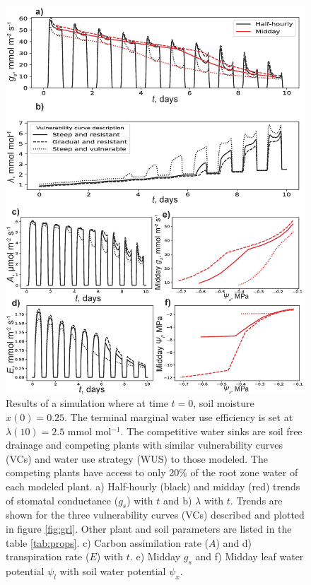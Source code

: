\documentclass[utf8]{frontiersSCNS} %
\begin{document}
\begin{figure}[h]
    \begin{center}
         \includegraphics[scale=0.65]{WUS_comp.jpg}   
    \end{center}
    \caption{Results of a simulation where at time $t=0$, soil moisture $x(0) =0.25$. The terminal marginal water use efficiency is set at $\lambda(10) = 2.5$ mmol mol$^{-1}$. The competitive water sinks are soil free drainage and competing plants with similar vulnerability curves (VCs) and water use strategy (WUS) to those modeled. The competing plants have access to only 20\% of the root zone water of each modeled plant. a) Half-hourly (black) and midday (red) trends of stomatal conductance ($g_s$) with $t$ and b) $\lambda$ with $t$. Trends are shown for the three vulnerability curves (VCs) described and plotted in figure \ref{fig:grl}. Other plant and soil parameters are listed in the table \ref{tab:props}. c) Carbon assimilation rate ($A$) and d) transpiration rate ($E$) with $t$. e) Midday $g_s$ and f) Midday leaf water potential $\psi_l$ with soil water potential $\psi_x$.}
    \label{fig:WUS_comp}
\end{figure}
\end{document}

